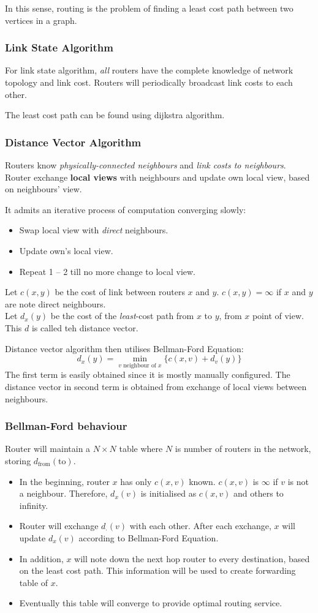 \documentclass[12pt]{article}
\theoremstyle{definition}
\begin{document}
In this sense, routing is the problem of finding a least cost path between two vertices in a graph.
\subsubsection{Link State Algorithm}
For link state algorithm, \textit{all} routers have the complete knowledge of network topology and link cost. Routers will periodically broadcast link costs to each other.

The least cost path can be found using dijkstra algorithm.
\subsubsection{Distance Vector Algorithm}
Routers know \textit{physically-connected neighbours} and \textit{link costs to neighbours}. Router exchange \textbf{local views} with neighbours and update own local view, based on neighbours' view.

It admits an iterative process of computation converging slowly:
\begin{itemize}
  \item Swap local view with \textit{direct} neighbours.
  \item Update own's local view.
  \item Repeat 1 -- 2 till no more change to local view.
\end{itemize}
Let $c(x,y)$ be the cost of link between routers $x$ and $y$. $c(x,y) = \infty$ if $x$ and $y$ are note direct neighbours. \\Let $d_x(y)$ be the cost of the \textit{least}-cost path from $x$ to $y$, from $x$ point of view. This $d$ is called teh distance vector.

Distance vector algorithm then utilises Bellman-Ford Equation:
\[
d_x(y) = \min_{v\text{ neighbour of }x}\{c(x,v)+d_v(y)\}
\]
The first term is easily obtained since it is mostly manually configured. The distance vector in second term is obtained from exchange of local views between neighbours.
\subsubsection{Bellman-Ford behaviour}
Router will maintain a $N\times N$ table where $N$ is number of routers in the network, storing $d_\text{from}(\text{to})$.
\begin{itemize}
\item In the beginning, router $x$ has only $c(x,v)$ known. $c(x,v)$ is $\infty$ if $v$ is not a neighbour. Therefore, $d_x(v)$ is initialised as $c(x,v)$ and others to infinity.
\item Router will exchange $d_\cdot(v)$ with each other. After each exchange, $x$ will update $d_x(v)$ according to Bellman-Ford Equation.
\item In addition, $x$ will note down the next hop router to every destination, based on the least cost path. This information will be used to create forwarding table of $x$.
\item Eventually this table will converge to provide optimal routing service.
\end{itemize}
\end{document}
